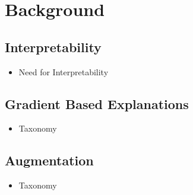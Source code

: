 \chapter{Background}
\section{Interpretability}
\begin{itemize}
	\item Need for Interpretability
\end{itemize}
\section{Gradient Based Explanations}
\begin{itemize}
	\item Taxonomy
\end{itemize}
\section{Augmentation}
\begin{itemize}
	\item Taxonomy
\end{itemize}
